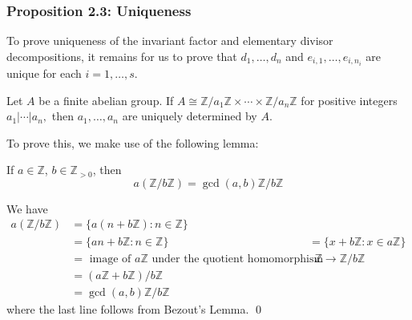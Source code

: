 \documentclass{article}
\renewenvironment{proof}{{\bfseries\color{blue1} Proof:}}{\qed}
\begin{document}
\subsubsection{Proposition 2.3: Uniqueness}
To prove uniqueness of the invariant factor and elementary divisor decompositions, it remains for us to prove that $d_1,\dots,d_n$ and $e_{i,1},\dots,e_{i,n_i}$ are unique for each $i=1,\dots, s$.
\begin{idea}
    Let $A$ be a finite abelian group. If $A \cong \mathbb{Z}/a_1\mathbb{Z} \times \cdots \times \mathbb{Z}/a_n \mathbb{Z}$ for positive integers $a_1|\cdots | a_n,$ then $a_1,\dots,a_n$ are uniquely determined by $A$.
\end{idea}
To prove this, we make use of the following lemma:
\begin{idea}
    If $a\in \mathbb{Z}$, $b\in \mathbb{Z}_{>0}$, then
    \begin{equation*}
        a(\mathbb{Z}/b\mathbb{Z}) = \gcd(a,b)\mathbb{Z}/b\mathbb{Z}
    \end{equation*}
\end{idea}
\begin{proof}
    We have
    \begin{align*}
        a(\mathbb{Z}/b\mathbb{Z}) &= \{a(n+b\mathbb{Z}): n\in \mathbb{Z} \} \\ 
        &= \{an+b\mathbb{Z} : n \in \mathbb{Z}\}
        &= \{x+b\mathbb{Z} : x\in a\mathbb{Z}\} \\ 
        &= \text{ image of $a\mathbb{Z}$ under the quotient homomorphism }\mathbb{Z} \rightarrow \mathbb{Z}/b\mathbb{Z} \\ 
        &= (a\mathbb{Z}+b\mathbb{Z})/b\mathbb{Z} \\ 
        &= \gcd(a,b)\mathbb{Z}/b\mathbb{Z}
    \end{align*}
    where the last line follows from Bezout's Lemma.
\end{proof}
\end{document}
